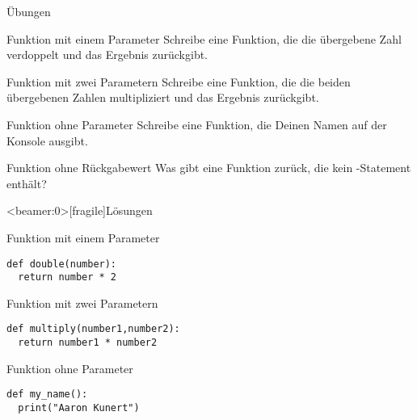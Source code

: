 \begin{frame}{Übungen}

\begin{block}{Funktion mit einem Parameter}
\vspace{2pt}
Schreibe eine Funktion, die die übergebene Zahl verdoppelt und das Ergebnis zurückgibt. 
\end{block}
\vspace{12pt}
\begin{block}{Funktion mit zwei Parametern}
\vspace{2pt}
Schreibe eine Funktion, die die beiden übergebenen Zahlen multipliziert und das Ergebnis zurückgibt. 
\end{block}
\vspace{12pt}
\begin{block}{Funktion ohne Parameter}
	\vspace{2pt}
Schreibe eine Funktion, die Deinen Namen auf der Konsole ausgibt. 
\end{block}
\vspace{12pt}
\begin{block}{Funktion ohne Rückgabewert}
\vspace{2pt}
Was gibt eine Funktion zurück, die kein -Statement enthält?
\end{block}
\end{frame}

\begin{frame}<beamer:0>[fragile]{Lösungen}


\begin{solutionblock}{Funktion mit einem Parameter}
\begin{verbatim}
def double(number): 
  return number * 2
\end{verbatim}
\end{solutionblock}

\vspace{12pt}

\begin{solutionblock}{Funktion mit zwei Parametern}
\begin{verbatim}
def multiply(number1,number2): 
  return number1 * number2
\end{verbatim}
\end{solutionblock}

\vspace{12pt}

\begin{solutionblock}{Funktion ohne Parameter}
\begin{verbatim}
def my_name(): 
  print("Aaron Kunert")
\end{verbatim}
\end{solutionblock}

\end{frame}

